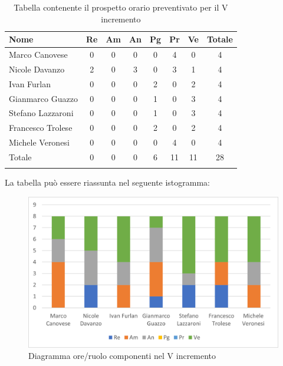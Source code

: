 \begin{longtable}{|l|c|c|c|c|c|c|c|}
	\hline
	\rowcolor{lighter-grayer}
	\textbf{Nome}     & \textbf{Re} & \textbf{Am} & \textbf{An} & \textbf{Pg} & \textbf{Pr} & \textbf{Ve} & \textbf{Totale} \\
	\hline
	\endfirsthead

	\hline
	Marco Canovese    & 0           & 0           & 0           & 0           & 4           & 0           & 4               \\
	\hline
	\hline
	Nicole Davanzo    & 2           & 0           & 3           & 0           & 3           & 1           & 4               \\
	\hline
	\hline
	Ivan Furlan       & 0           & 0           & 0           & 2           & 0           & 2           & 4               \\
	\hline
	\hline
	Gianmarco Guazzo  & 0           & 0           & 0           & 1           & 0           & 3           & 4               \\
	\hline
	\hline
	Stefano Lazzaroni & 0           & 0           & 0           & 1           & 0           & 3           & 4               \\
	\hline
	\hline
	Francesco Trolese & 0           & 0           & 0           & 2           & 0           & 2           & 4               \\
	\hline
	\hline
	Michele Veronesi  & 0           & 0           & 0           & 0           & 4           & 0           & 4               \\
	\hline
	\hline
	Totale            & 0           & 0          & 0          & 6           & 11           & 11          & 28              \\
	\hline
	\rowcolor{white}
	\caption{Tabella contenente il prospetto orario preventivato per il V incremento}
\end{longtable}


La tabella può essere riassunta nel seguente istogramma:

\begin{figure}[H]
	\centering
	\includegraphics[width=0.8\linewidth]{res/images/preventivo/dettaglio_analisi/2-1.png}
	\caption{Diagramma ore/ruolo componenti nel V incremento}
	\label{fig:diagramma suddivisione ruoli V incremento}
\end{figure}

